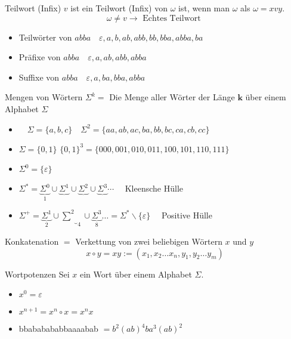 \begin{definition}{Teilwort (Infix)}
    $v$ ist ein Teilwort (Infix) von $\omega$ ist, wenn man $\omega$ als $\omega=x v y$.
    $$
    \omega \neq v \rightarrow \text { Echtes Teilwort }
    $$
    \begin{itemize}
        \item Teilwörter von $a b b a \quad \varepsilon, a, b, a b, a b b, b b, b b a, a b b a, b a$
        \item Präfixe von $a b b a \quad \varepsilon, a, a b, a b b, a b b a$
        \item Suffixe von $a b b a \quad \varepsilon, a, b a, b b a, a b b a$
    \end{itemize}
\end{definition}

\begin{definition}{Mengen von Wörtern}
    $\Sigma^{k}=$ Die Menge aller Wörter der Länge $\boldsymbol{k}$ über einem Alphabet $\Sigma$

    \begin{itemize}
      \item $\quad \Sigma=\{a, b, c\} \quad \Sigma^{2}=\{a a, a b, a c, b a, b b, b c, c a, c b, c c\}$
      \item $\Sigma=\{0,1\}$ \quad $\{0,1\}^{3}=\{000,001,010,011,100,101,110,111\}$
      \item $\Sigma^{0}=\{\varepsilon\}$
    \end{itemize}

    \begin{itemize}
        \item $\Sigma^{*}=\underbrace{\Sigma^{0}}_{1} \cup \underbrace{\Sigma^{1}} \cup \underbrace{\Sigma^{2}} \cup \underbrace{\Sigma^{3}} \cdots \quad$ Kleensche Hülle
        \item $\Sigma^{+}=\underbrace{\Sigma^{1}}_{2} \cup \underbrace{\sum^{2}}_{4} \cup \underbrace{\Sigma^{3}}_{8} \ldots=\Sigma^{*} \backslash\{\varepsilon\} \quad$ Positive Hülle
      \end{itemize}
\end{definition}

\begin{definition}{Konkatenation}
    $=$ Verkettung von zwei beliebigen Wörtern $x$ und $y$
    $$
    x \circ y=x y:=\left(x_{1}, x_{2} \ldots x_{n}, y_{1}, y_{2} \ldots y_{m}\right)
    $$
\end{definition}

\begin{definition}{Wortpotenzen}
    Sei $x$ ein Wort über einem Alphabet $\Sigma$.
    \begin{itemize}
    \item $x^{0}=\varepsilon$
    \item $x^{n+1}=x^{n} \circ x=x^{n} x$
    \item bbababababbaaaabab $=b^{2}(a b)^{4} b a^{3}(a b)^{2}$
    \end{itemize}
\end{definition}

